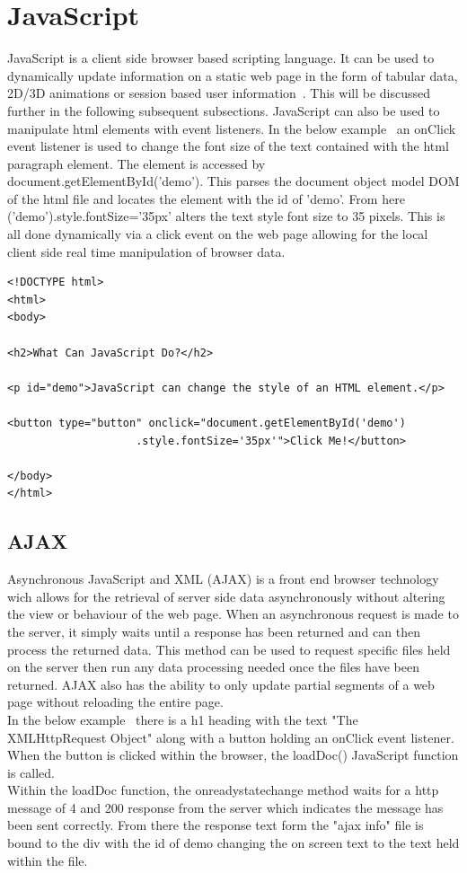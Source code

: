 \section{JavaScript}
JavaScript is a client side browser based scripting language.
It can be used to dynamically update information on a static web page in the form of tabular data, 2D/3D animations or session based user information~\cite{JavaScri52:online}. This will be discussed further in the following subsequent subsections. JavaScript can also be used to manipulate html elements with event listeners. In the below example~\cite{fontSize:online} an onClick event listener is used to change the font size of the text contained with the html paragraph element. The element is accessed by document.getElementById('demo'). This parses the document object model DOM of the html file and locates the element with the id of 'demo'. From here  ('demo').style.fontSize='35px' alters the text style font size to 35 pixels.
This is all done dynamically via a click event on the web page allowing for the local client side real time manipulation of browser data.
\begin{verbatim}
<!DOCTYPE html>
<html>
<body>

<h2>What Can JavaScript Do?</h2>

<p id="demo">JavaScript can change the style of an HTML element.</p>

<button type="button" onclick="document.getElementById('demo')
                    .style.fontSize='35px'">Click Me!</button>

</body>
</html> 
\end{verbatim}  
\subsection{AJAX}
Asynchronous JavaScript and XML (AJAX) is a front end browser technology wich allows for the retrieval of server side data asynchronously without altering the view or behaviour of the web page. When an asynchronous request is made to the server, it simply waits until a response has been returned and can then process the returned data. This method can be used to request specific files held on the server then run any data processing needed once the files have been returned.  AJAX also has the ability to only update partial segments of a web page without reloading the entire page.~\cite{AJAX:online}\\
In the below example~\cite{AJAXDemo:online} there is a h1 heading with the text "The XMLHttpRequest Object" along with a button holding an onClick event listener. When the button is clicked within the browser, the loadDoc() JavaScript function is called.\\
Within the loadDoc function, the onreadystatechange method waits for a http message of 4 and 200 response from the server which indicates the message has been sent correctly. From there the response text form the "ajax info" file is bound to the div with the id of demo changing the on screen text to the text held within the file.\\
 
